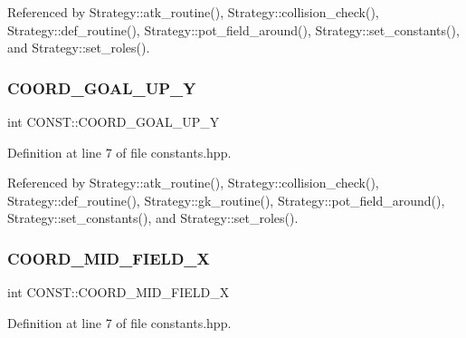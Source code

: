 Referenced by Strategy\+::atk\+\_\+routine(), Strategy\+::collision\+\_\+check(), Strategy\+::def\+\_\+routine(), Strategy\+::pot\+\_\+field\+\_\+around(), Strategy\+::set\+\_\+constants(), and Strategy\+::set\+\_\+roles().

\mbox{\label{namespace_c_o_n_s_t_ab1e77f62ff88d04c9aac407f4405add2}} 
\subsubsection{\texorpdfstring{C\+O\+O\+R\+D\+\_\+\+G\+O\+A\+L\+\_\+\+U\+P\+\_\+Y}{COORD\_GOAL\_UP\_Y}}
{\footnotesize\ttfamily int C\+O\+N\+S\+T\+::\+C\+O\+O\+R\+D\+\_\+\+G\+O\+A\+L\+\_\+\+U\+P\+\_\+Y\hspace{0.3cm}{\ttfamily [static]}}



Definition at line 7 of file constants.\+hpp.



Referenced by Strategy\+::atk\+\_\+routine(), Strategy\+::collision\+\_\+check(), Strategy\+::def\+\_\+routine(), Strategy\+::gk\+\_\+routine(), Strategy\+::pot\+\_\+field\+\_\+around(), Strategy\+::set\+\_\+constants(), and Strategy\+::set\+\_\+roles().

\mbox{\label{namespace_c_o_n_s_t_ad21da2e838c0a8da29db74cba008cf46}} 
\subsubsection{\texorpdfstring{C\+O\+O\+R\+D\+\_\+\+M\+I\+D\+\_\+\+F\+I\+E\+L\+D\+\_\+X}{COORD\_MID\_FIELD\_X}}
{\footnotesize\ttfamily int C\+O\+N\+S\+T\+::\+C\+O\+O\+R\+D\+\_\+\+M\+I\+D\+\_\+\+F\+I\+E\+L\+D\+\_\+X\hspace{0.3cm}{\ttfamily [static]}}



Definition at line 7 of file constants.\+hpp.




